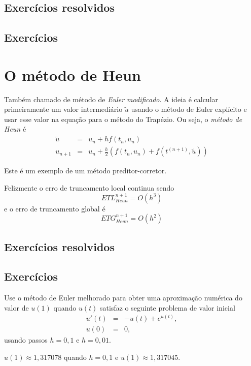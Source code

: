 \subsection*{Exercícios resolvidos}

\emconstrucao

\subsection*{Exercícios}

\emconstrucao


\section{O método de Heun}
Também chamado de método de \emph{Euler modificado}. A ideia é calcular primeiramente um valor intermediário $\tilde{u}$ usando o método de Euler expl\'icito e usar esse valor na equação para o método do Trapézio. Ou seja, o \emph{método de Heun} é
\begin{eqnarray}
  \tilde{u} &=& u_n +   h f(t_n,u_n) \\
  u_{n+1}   &=& u_n +  \frac{h}{2} \left(f(t_n,u_n)+f(t^{(n+1)},\tilde{u})\right)
\end{eqnarray}

Este é um exemplo de um método preditor-corretor.

Felizmente o erro de truncamento local continua sendo
$$ETL_{Heun}^{n+1}= O(h^3)$$
e o erro de truncamento global é
$$ETG_{Heun}^{n+1}= O(h^2)$$


\subsection*{Exercícios resolvidos}

\emconstrucao

\subsection*{Exercícios}

\begin{exer} Use o método de Euler melhorado para obter uma aproximação numérica do valor de $u(1)$ quando $u(t)$ satisfaz o seguinte problema de valor inicial
\begin{eqnarray*}
 u'(t)&=&-u(t)+ e^{u(t)},\\
 u(0)&=&0,
\end{eqnarray*}
usando passos $h=0,1$ e $h=0,01$.
\end{exer}
\begin{resp}
 $u(1)\approx 1,317078$ quando $h=0,1$ e $u(1)\approx 1,317045$.
\end{resp}


